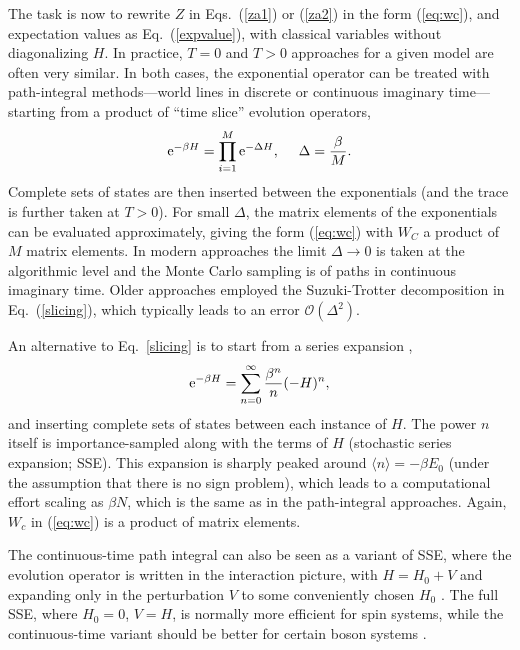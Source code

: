 \documentclass[range]{ar2e}
\begin{document}
The task is now to rewrite $Z$ in Eqs.~(\ref{za1}) or (\ref{za2}) in the form (\ref{eq:wc}), and expectation values as Eq.~(\ref{expvalue}), with classical variables 
without diagonalizing $H$. In practice, $T=0$ and $T>0$ approaches for a given model are often very similar. In both cases, the exponential 
operator can be treated with path-integral methods---world lines in discrete \cite{Suzuki77,Hirsch82} or continuous \cite{Beard96,Prokofev96,Prokofev98} 
imaginary time---starting from a product of ``time slice'' evolution operators,
\begin{equation}
{\rm e}^{-\beta H}= \prod_{i=1}^M {\rm e}^{-\Delta H},~~~~ \Delta=\frac{\beta}{M}.
\label{slicing}
\end{equation}
Complete sets of states are then inserted between the exponentials (and the trace is further taken at $T>0$). For small $\Delta$, the
matrix elements of the exponentials can be evaluated approximately, giving the form (\ref{eq:wc}) with $W_C$ a product of $M$ matrix elements. 
In modern approaches the limit $\Delta \to 0$ is taken at the algorithmic level \cite{Prokofev96,WormA,Beard96} and the Monte Carlo sampling is of 
paths in continuous imaginary time. Older approaches employed the Suzuki-Trotter decomposition \cite{Suzuki76} in Eq.~(\ref{slicing}), which 
typically leads to an error $\mathcal{O}(\Delta^2)$.

An alternative to Eq.~\ref{slicing} is to start from a series expansion \cite{Handscomb62,Sandvik91},
\begin{equation}
{\rm e}^{-\beta H}= \sum_{n=0}^\infty \frac{\beta^n}{n}(-H)^n,
\label{series}
\end{equation}
and inserting complete sets of states between each instance of $H$. The power $n$ itself is importance-sampled along with the terms of $H$ 
(stochastic series expansion; SSE). This expansion is sharply peaked around $\langle n\rangle = -\beta E_0$ (under the assumption that there 
is no sign problem), which leads to a computational effort scaling as $\beta N$, which is the same as in the path-integral approaches. Again, $W_c$ 
in (\ref{eq:wc}) is a product of matrix elements. 

The continuous-time path integral can also be seen as a variant of SSE, where the evolution operator is written in the interaction picture, 
with $H=H_0+V$ and expanding only in the perturbation $V$ to some conveniently chosen $H_0$ \cite{Prokofev96,Sandvik97a}. The full SSE, where $H_0=0$, $V=H$, 
is normally more efficient for spin systems, while the continuous-time variant should be better for certain boson systems \cite{Troyer03}.
\end{document}
